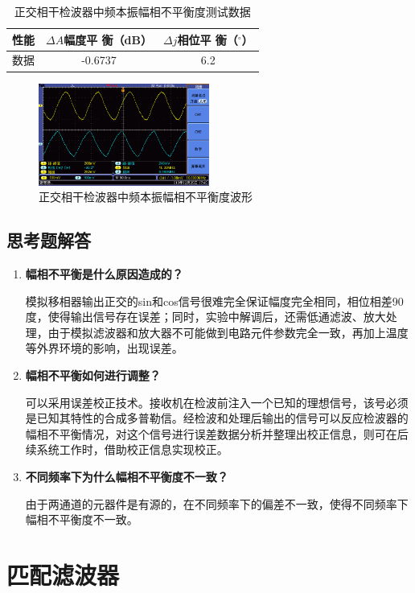 \documentclass[12pt]{article}
\begin{document}
\begin{table}[htbp]
  \centering
  \caption{正交相干检波器中频本振幅相不平衡度测试数据}
    \begin{tabular}{|c|c|c|}
    \hline
    性能 &$\Delta A $幅度平 衡（dB） &$\Delta j $相位平 衡（$ ^\circ$）  \\
    \hline
    数据 & -0.6737 & 6.2 \\
    \hline
    \end{tabular}%
  \label{tab:addlabel1112}%
\end{table}%
\begin{figure}[htbp]
  \centering
  \includegraphics[width=0.5\textwidth]{data3/new/F0008TEK}
  \caption{正交相干检波器中频本振幅相不平衡度波形}\label{ZJXGJTQZPXHFXBPHD1}
\end{figure}
\subsection{思考题解答}
\begin{enumerate}
  \item \textbf{幅相不平衡是什么原因造成的？}\par
  模拟移相器输出正交的sin和cos信号很难完全保证幅度完全相同，相位相差90度，使得输出信号存在误差；同时，实验中解调后，还需低通滤波、放大处理，由于模拟滤波器和放大器不可能做到电路元件参数完全一致，再加上温度等外界环境的影响，出现误差。
\item \textbf{幅相不平衡如何进行调整？}\par
可以采用误差校正技术。接收机在检波前注入一个已知的理想信号，该号必须是已知其特性的合成多普勒信。经检波和处理后输出的信号可以反应检波器的幅相不平衡情况，对这个信号进行误差数据分析并整理出校正信息，则可在后续系统工作时，借助校正信息实现校正。
\item \textbf{不同频率下为什么幅相不平衡度不一致？}\par
由于两通道的元器件是有源的，在不同频率下的偏差不一致，使得不同频率下幅相不平衡度不一致。
\end{enumerate}
\newpage
\section{匹配滤波器}
\setcounter{equation}{0}
\setcounter{table}{0}
\setcounter{figure}{0}
\end{document}
